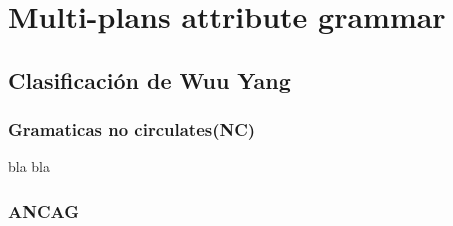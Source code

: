 \chapter{Multi-plans attribute grammar}
\label{chap:mag}
\minitoc




\section{Clasificaci\'on de Wuu Yang}

\subsection{Gramaticas no circulates(NC)}
bla bla

\subsection{ANCAG}


